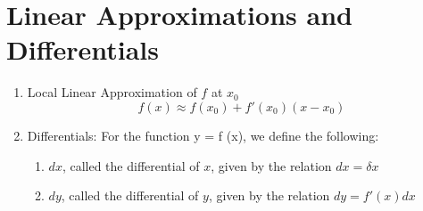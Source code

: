 \section{Linear Approximations and Differentials}

\begin{myframe}[arc=10pt,auto outer arc]
\begin{enumerate}
\item Local Linear Approximation of $f$ at $x_0$
\[ f(x) \approx f(x_0) + f'(x_0) (x - x_0) \]
\item Differentials: For the function y = f (x), we define the following:
\begin{enumerate}
\item $dx$, called the differential of $x$, given by the relation $dx = \delta x$
\item $dy$, called the differential of $y$, given by the relation $dy = f'(x)dx$
\end{enumerate}
\end{enumerate}
\end{myframe}


\newpage
{}



